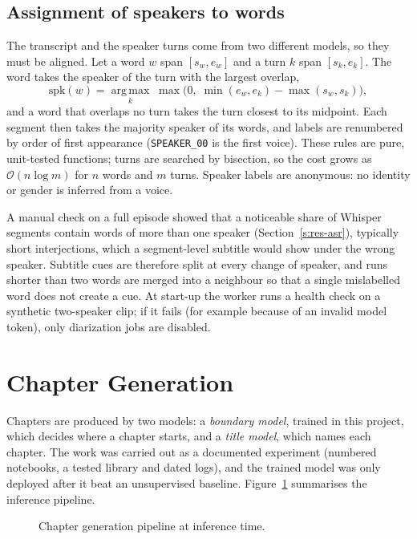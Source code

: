 \subsection*{Assignment of speakers to words}

The transcript and the speaker turns come from two different models, so they must be aligned. Let a word $w$ span $[s_w, e_w]$ and a turn $k$ span $[s_k, e_k]$. The word takes the speaker of the turn with the largest overlap,
\begin{equation}
\mathrm{spk}(w) = \operatorname*{arg\,max}_{k}\; \max\big(0,\; \min(e_w, e_k) - \max(s_w, s_k)\big),
\label{eq:assign}
\end{equation}
and a word that overlaps no turn takes the turn closest to its midpoint. Each segment then takes the majority speaker of its words, and labels are renumbered by order of first appearance (\texttt{SPEAKER\_00} is the first voice). These rules are pure, unit-tested functions; turns are searched by bisection, so the cost grows as $\mathcal{O}(n \log m)$ for $n$ words and $m$ turns. Speaker labels are anonymous: no identity or gender is inferred from a voice.

A manual check on a full episode showed that a noticeable share of Whisper segments contain words of more than one speaker (Section~\ref{s:res-asr}), typically short interjections, which a segment-level subtitle would show under the wrong speaker. Subtitle cues are therefore split at every change of speaker, and runs shorter than two words are merged into a neighbour so that a single mislabelled word does not create a cue. At start-up the worker runs a health check on a synthetic two-speaker clip; if it fails (for example because of an invalid model token), only diarization jobs are disabled.

\section{Chapter Generation}
\label{s:chapters}

Chapters are produced by two models: a \textit{boundary model}, trained in this project, which decides where a chapter starts, and a \textit{title model}, which names each chapter. The work was carried out as a documented experiment (numbered notebooks, a tested library and dated logs), and the trained model was only deployed after it beat an unsupervised baseline. Figure~\ref{fig:chapters} summarises the inference pipeline.

\begin{figure}[H]
\centering
{}
\caption{Chapter generation pipeline at inference time.}
\label{fig:chapters}
\end{figure}

